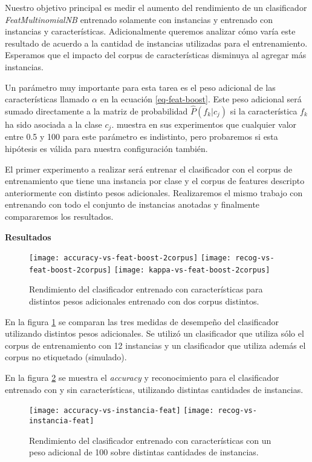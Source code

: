 Nuestro objetivo principal es medir el aumento del rendimiento de un clasificador \textit{FeatMultinomialNB} entrenado solamente con instancias y entrenado con instancias y características. Adicionalmente queremos analizar cómo varía este resultado de acuerdo a la cantidad de instancias utilizadas para el entrenamiento. Esperamos que el impacto del corpus de características disminuya al agregar más instancias.

Un parámetro muy importante para esta tarea es el peso adicional de las características llamado $\alpha$ en la ecuación \ref{eq-feat-boost}. Este peso adicional será sumado directamente a la matriz de probabilidad $\hat{P}(f_k|c_j)$ si la característica $f_k$ ha sido asociada a la clase $c_j$. \citet{dualist} muestra en sus experimentos que cualquier valor entre 0.5 y 100 para este parámetro es indistinto, pero probaremos si esta hipótesis es válida para nuestra configuración también.

El primer experimento a realizar será entrenar el clasificador con el corpus de entrenamiento que tiene una instancia por clase y el corpus de features descripto anteriormente con distinto pesos adicionales. Realizaremos el mismo trabajo con entrenando con todo el conjunto de instancias anotadas y finalmente compararemos los resultados.

\vspace{3 mm}

\textbf{Resultados}
\begin{figure}[h!]
\centering
\texttt{[image: accuracy-vs-feat-boost-2corpus]}
\texttt{[image: recog-vs-feat-boost-2corpus]}
\texttt{[image: kappa-vs-feat-boost-2corpus]}
\caption{Rendimiento del clasificador entrenado con características para distintos pesos adicionales entrenado con dos corpus distintos.}\label{comp-feature-boost}
\end{figure}

En la figura \ref{comp-feature-boost} se comparan las tres medidas de desempeño del clasificador utilizando distintos pesos adicionales. Se utilizó un clasificador que utiliza sólo el corpus de entrenamiento con 12 instancias y un clasificador que utiliza además el corpus no etiquetado (simulado).


En la figura \ref{comp-feat-tr-inst} se muestra el \textit{accuracy} y reconocimiento para el clasificador entrenado con y sin características, utilizando distintas cantidades de instancias.

\begin{figure}[h!]
\centering
\texttt{[image: accuracy-vs-instancia-feat]}
\texttt{[image: recog-vs-instancia-feat]}
\caption{Rendimiento del clasificador entrenado con características con un peso adicional de 100 sobre distintas cantidades de instancias.}\label{comp-feat-tr-inst}
\end{figure}
\vspace{3 mm}

